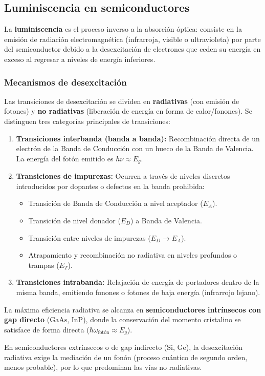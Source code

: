 \newpage
\subsection{Luminiscencia en semiconductores}

La \textbf{luminiscencia} es el proceso inverso a la absorción óptica: consiste en la emisión de radiación electromagnética (infrarroja, visible o ultravioleta) por parte del semiconductor debido a la desexcitación de electrones que ceden su energía en exceso al regresar a niveles de energía inferiores.

\subsubsection{Mecanismos de desexcitación}

Las transiciones de desexcitación se dividen en \textbf{radiativas} (con emisión de fotones) y \textbf{no radiativas} (liberación de energía en forma de calor/fonones). Se distinguen tres categorías principales de transiciones:

\begin{enumerate}
    \item \textbf{Transiciones interbanda (banda a banda):} Recombinación directa de un electrón de la Banda de Conducción con un hueco de la Banda de Valencia. La energía del fotón emitido es $h\nu \approx E_g$.
    \item \textbf{Transiciones de impurezas:} Ocurren a través de niveles discretos introducidos por dopantes o defectos en la banda prohibida:
    \begin{itemize}
        \item Transición de Banda de Conducción a nivel aceptador ($E_A$).
        \item Transición de nivel donador ($E_D$) a Banda de Valencia.
        \item Transición entre niveles de impurezas ($E_D \to E_A$).
        \item Atrapamiento y recombinación no radiativa en niveles profundos o trampas ($E_T$).
    \end{itemize}
    \item \textbf{Transiciones intrabanda:} Relajación de energía de portadores dentro de la misma banda, emitiendo fonones o fotones de baja energía (infrarrojo lejano).
\end{enumerate}

\begin{concepto}
La máxima eficiencia radiativa se alcanza en \textbf{semiconductores intrínsecos con gap directo} ($\text{GaAs}$, $\text{InP}$), donde la conservación del momento cristalino se satisface de forma directa ($\hbar\omega_{\text{fotón}} \approx E_g$).

En semiconductores extrínsecos o de gap indirecto ($\text{Si}$, $\text{Ge}$), la desexcitación radiativa exige la mediación de un fonón (proceso cuántico de segundo orden, menos probable), por lo que predominan las vías no radiativas.
\end{concepto}

